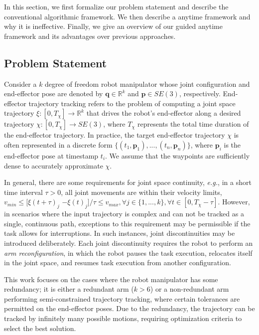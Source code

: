 In this section, we first formalize our problem statement and describe the conventional algorithmic framework. We then describe a \naive anytime framework and why it is ineffective.
Finally, we give an overview of our guided anytime framework and its advantages over previous approaches. 

\vspace{-3mm}
\subsection{Problem Statement}

Consider a $k$ degree of freedom robot manipulator whose joint configuration and end-effector pose are denoted by $\mathbf{q} {\in} \mathbb{R}^k$ and $\mathbf{p} {\in} SE(3)$, respectively. 
End-effector trajectory tracking refers to the problem of computing a joint space trajectory $\xi{:}[0,T_\chi] {\rightarrow} \mathbb{R}^k$ that drives the robot's end-effector along a desired trajectory $\chi{:}[0,T_\chi] {\rightarrow} SE(3)$, where $T_\chi$ represents the total time duration of the end-effector trajectory. In practice, the target end-effector trajectory $\chi$ is often represented in a discrete form $\{(t_1, \mathbf{p}_1), ..., (t_{n}, \mathbf{p}_{n})\}$, where $\mathbf{p}_i$ is the end-effector pose at timestamp $t_i$. We assume that the waypoints are sufficiently dense to accurately approximate $\chi$. 

In general, there are some requirements for joint space continuity, \textit{e.g.}, in a short time interval $\tau {>} 0$, all joint movements are within their velocity limits, $v_{min} {\leq}[\xi(t{+}\tau)_j$
$ {-} \xi(t)_j]/\tau {\leq} v_{max}, \forall j {\in} \{1,...,k\}, \forall t {\in} [0, T_\chi {-} \tau]$. However, in scenarios where the input trajectory is complex and can not be tracked as a single, continuous path, exceptions to this requirement may be permissible if the task allows for interruptions. In such instances, joint discontinuities may be introduced deliberately. Each joint discontinuity requires the robot to perform an \textit{arm reconfiguration}, in which the robot pauses the task execution, relocates itself in the joint space, and resumes task execution from another configuration. 

This work focuses on the cases where the robot manipulator has some redundancy; it is either a redundant arm ($k>6$) or a non-redundant arm performing semi-constrained trajectory tracking, where certain tolerances are permitted on the end-effector poses. 
Due to the redundancy, the trajectory can be tracked by infinitely many possible motions, requiring optimization criteria to select the best solution.


